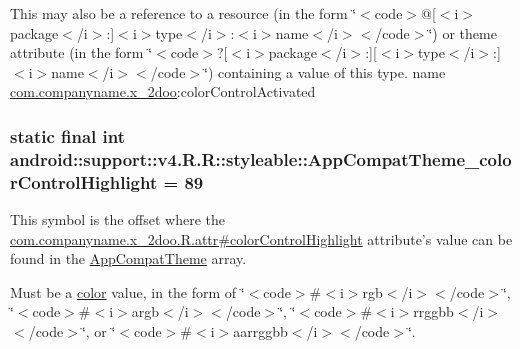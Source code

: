 This may also be a reference to a resource (in the form \char`\"{}$<$code$>$@\mbox{[}$<$i$>$package$<$/i$>$:\mbox{]}$<$i$>$type$<$/i$>$:$<$i$>$name$<$/i$>$$<$/code$>$\char`\"{}) or theme attribute (in the form \char`\"{}$<$code$>$?\mbox{[}$<$i$>$package$<$/i$>$:\mbox{]}\mbox{[}$<$i$>$type$<$/i$>$:\mbox{]}$<$i$>$name$<$/i$>$$<$/code$>$\char`\"{}) containing a value of this type.  name \hyperlink{namespacecom_1_1companyname_1_1x__2doo}{com.companyname.x\_\-2doo}:colorControlActivated \hypertarget{classandroid_1_1support_1_1v4_1_1_r_1_1styleable_346d6c8a5cb33583cb24fea2db2499ae}{
\subsubsection[{AppCompatTheme\_\-colorControlHighlight}]{\setlength{\rightskip}{0pt plus 5cm}static final int android::support::v4.R.R::styleable::AppCompatTheme\_\-colorControlHighlight = 89}}
\label{classandroid_1_1support_1_1v4_1_1_r_1_1styleable_346d6c8a5cb33583cb24fea2db2499ae}


This symbol is the offset where the \hyperlink{classcom_1_1companyname_1_1x__2doo_1_1_r_1_1attr_1e64bb96b5191150557a2d6b4d8dba2b}{com.companyname.x\_\-2doo.R.attr\#colorControlHighlight} attribute's value can be found in the \hyperlink{classandroid_1_1support_1_1v4_1_1_r_1_1styleable_0873e92ba21076bb5a4aeadeb7f5779f}{AppCompatTheme} array.

Must be a \hyperlink{classandroid_1_1support_1_1v4_1_1_r_1_1color}{color} value, in the form of \char`\"{}$<$code$>$\#$<$i$>$rgb$<$/i$>$$<$/code$>$\char`\"{}, \char`\"{}$<$code$>$\#$<$i$>$argb$<$/i$>$$<$/code$>$\char`\"{}, \char`\"{}$<$code$>$\#$<$i$>$rrggbb$<$/i$>$$<$/code$>$\char`\"{}, or \char`\"{}$<$code$>$\#$<$i$>$aarrggbb$<$/i$>$$<$/code$>$\char`\"{}. 

